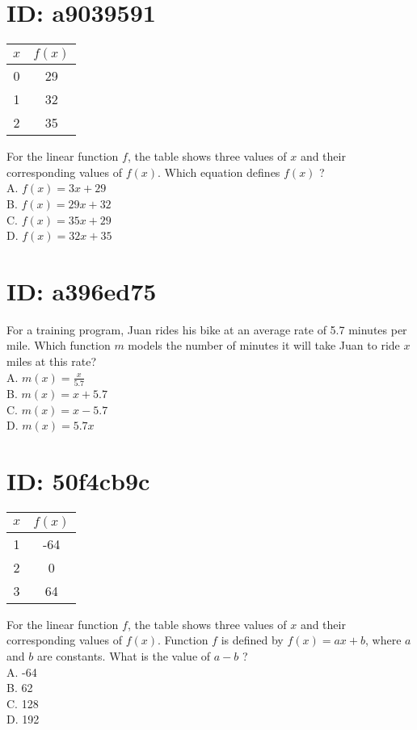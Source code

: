 \section*{ID: a9039591}
\begin{center}
\begin{tabular}{|c|c|}
\hline
$x$ & $f(x)$ \\
\hline
0 & 29 \\
\hline
1 & 32 \\
\hline
2 & 35 \\
\hline
\end{tabular}
\end{center}

For the linear function $f$, the table shows three values of $x$ and their corresponding values of $f(x)$. Which equation defines $f(x)$ ?\\
A. $f(x)=3 x+29$\\
B. $f(x)=29 x+32$\\
C. $f(x)=35 x+29$\\
D. $f(x)=32 x+35$

\section*{ID: a396ed75}
For a training program, Juan rides his bike at an average rate of 5.7 minutes per mile. Which function $m$ models the number of minutes it will take Juan to ride $x$ miles at this rate?\\
A. $m(x)=\frac{x}{5.7}$\\
B. $m(x)=x+5.7$\\
C. $m(x)=x-5.7$\\
D. $m(x)=5.7 x$

\section*{ID: 50f4cb9c}
\begin{center}
\begin{tabular}{|c|c|}
\hline
$x$ & $f(x)$ \\
\hline
1 & -64 \\
\hline
2 & 0 \\
\hline
3 & 64 \\
\hline
\end{tabular}
\end{center}

For the linear function $f$, the table shows three values of $x$ and their corresponding values of $f(x)$. Function $f$ is defined by $f(x)=a x+b$, where $a$ and $b$ are constants. What is the value of $a-b$ ?\\
A. -64\\
B. 62\\
C. 128\\
D. 192

